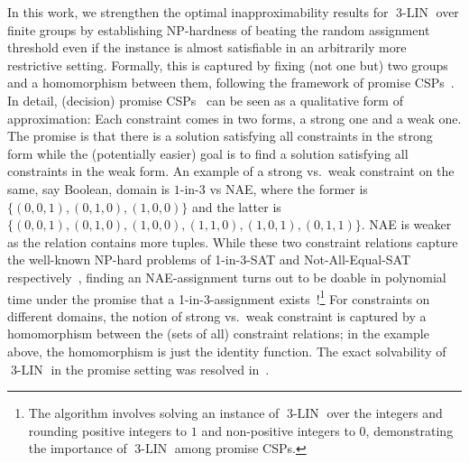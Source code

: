 \documentclass[a4paper,11pt]{article}
\theoremstyle{definition}
\newcommand{\eq}{\ensuremath{\operatorname{3-LIN}}}
\begin{document}
\medskip

In this work, we strengthen the optimal inapproximability results for $\eq$ over
finite groups by establishing NP-hardness of beating the random assignment threshold even if the instance is almost
satisfiable in an arbitrarily more restrictive setting. Formally, this is
captured by fixing (not one but) two groups and a homomorphism between
them, following the framework of promise CSPs~\cite{AGH17,BBKO21}. 
%
In detail, (decision) promise CSPs~\cite{BBKO21} can be seen as a qualitative
form of approximation: Each constraint comes in two forms, a strong one and a
weak one. The promise is that there is a solution satisfying all constraints in
the strong form while the (potentially easier) goal is to find a solution
satisfying all constraints in the weak form. An example of a strong vs.\ weak
constraint on the same, say Boolean, domain is $1$-in-$3$ vs NAE, where the former is $\{(0,0,1),(0,1,0),(1,0,0)\}$ and the latter is $\{(0,0,1),(0,1,0),(1,0,0),(1,1,0),(1,0,1),(0,1,1)\}$. NAE is weaker as the relation contains more tuples. 
While these two constraint relations capture the well-known NP-hard problems of
1-in-3-SAT and Not-All-Equal-SAT respectively~\cite{Schaefer78:stoc}, finding an
NAE-assignment turns out to be doable in polynomial time under the promise that
a 1-in-3-assignment exists~\cite{BG21}!\footnote{The algorithm involves solving
an instance of $\eq$ over the integers and rounding positive integers to $1$ and
non-positive integers to $0$, demonstrating the importance of $\eq$ among
promise CSPs.}
For constraints on different domains, the notion of strong vs.\ weak constraint is captured by a homomorphism between the (sets of all) constraint relations; in the example above, the homomorphism is just the identity function.
%
The exact solvability of $\eq$ in the promise setting was resolved in~\cite{LZ25:tocl}.
\end{document}
